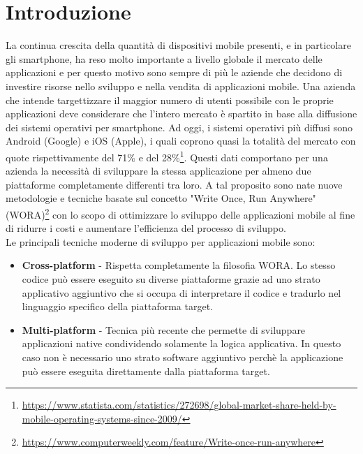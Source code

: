 
\section{Introduzione}
La continua crescita della quantità di dispositivi mobile presenti, e in particolare gli smartphone, ha reso molto importante a livello globale il mercato delle applicazioni e per questo motivo sono sempre di più le aziende che decidono di investire risorse nello sviluppo e nella vendita di applicazioni mobile. Una azienda che intende targettizzare il maggior numero di utenti possibile con le proprie applicazioni deve considerare che l'intero mercato è spartito in base alla diffusione dei sistemi operativi per smartphone. Ad oggi, i sistemi operativi più diffusi sono Android (Google) e iOS (Apple), i quali coprono quasi la totalità del mercato con quote rispettivamente del 71\% e del 28\%\footnote{\href{https://www.statista.com/statistics/272698/global-market-share-held-by-mobile-operating-systems-since-2009/}{https://www.statista.com/statistics/272698/global-market-share-held-by-mobile-operating-systems-since-2009/}}. Questi dati comportano per una azienda la necessità di sviluppare la stessa applicazione per almeno due piattaforme completamente differenti tra loro. A tal proposito sono nate nuove metodologie e tecniche basate sul concetto "Write Once, Run Anywhere" (WORA)\footnote{\href{https://www.computerweekly.com/feature/Write-once-run-anywhere}{https://www.computerweekly.com/feature/Write-once-run-anywhere}} con lo scopo di ottimizzare lo sviluppo delle applicazioni mobile al fine di ridurre i costi e aumentare l'efficienza del processo di sviluppo.\\
Le principali tecniche moderne di sviluppo per applicazioni mobile sono:
\begin{itemize}
    \item \textbf{Cross-platform} - Rispetta completamente la filosofia WORA. Lo stesso codice può essere eseguito su diverse piattaforme grazie ad uno strato applicativo aggiuntivo che si occupa di interpretare il codice e tradurlo nel linguaggio specifico della piattaforma target.
    \item \textbf{Multi-platform} - Tecnica più recente che permette di sviluppare applicazioni native condividendo solamente la logica applicativa. In questo caso non è necessario uno strato software aggiuntivo perchè la applicazione può essere eseguita direttamente dalla piattaforma target.
\end{itemize}

